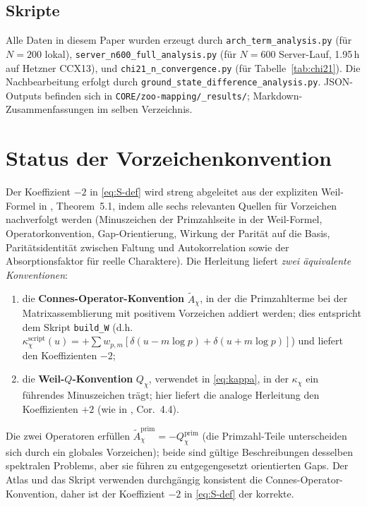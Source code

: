 \documentclass[10pt,twocolumn]{article}
\theoremstyle{definition}
\theoremstyle{remark}
\newcommand{\chifn}{\chi}
\begin{document}
\subsection{Skripte}
Alle Daten in diesem Paper wurden erzeugt durch
\texttt{arch\_term\_analysis.py} (für $N=200$ lokal),
\texttt{server\_n600\_full\_analysis.py} (für $N=600$ Server-Lauf,
1.95\,h auf Hetzner CCX13), und
\texttt{chi21\_n\_convergence.py} (für Tabelle~\ref{tab:chi21}).
Die Nachbearbeitung erfolgt durch \texttt{ground\_state\_difference\_analysis.py}.
JSON-Outputs befinden sich in \texttt{CORE/zoo-mapping/\_results/}; Markdown-Zusammenfassungen im selben Verzeichnis.

\section{Status der Vorzeichenkonvention}
\label{app:sign}

Der Koeffizient $-2$ in \eqref{eq:S-def} wird streng abgeleitet aus
der expliziten Weil-Formel in \cite{AnalyticKernelV2},
Theorem~5.1, indem alle sechs relevanten Quellen für Vorzeichen nachverfolgt werden (Minuszeichen der Primzahlseite in der Weil-Formel,
Operatorkonvention, Gap-Orientierung, Wirkung der Parität auf die Basis, Paritätsidentität zwischen
Faltung und Autokorrelation sowie der Absorptionsfaktor für reelle Charaktere).
Die Herleitung liefert \emph{zwei äquivalente Konventionen}:
\begin{enumerate}
  \item die \textbf{Connes-Operator-Konvention} $\tilde A_{\chifn}$,
    in der die Primzahlterme bei der Matrixassemblierung mit positivem Vorzeichen
    addiert werden; dies entspricht dem Skript
    \texttt{build\_W} (d.h.\ $\kappa^{\mathrm{script}}_{\chifn}(u)
    =+\sum w_{p,m}[\delta(u-m\log p)+\delta(u+m\log p)]$) und
    liefert den Koeffizienten $-2$;
  \item die \textbf{Weil-$Q$-Konvention} $Q_{\chifn}$, verwendet in
    \eqref{eq:kappa}, in der $\kappa_{\chifn}$ ein führendes
    Minuszeichen trägt; hier liefert die analoge Herleitung den
    Koeffizienten $+2$ (wie in \cite{AnalyticKernel}, Cor.~4.4).
\end{enumerate}
Die zwei Operatoren erfüllen
$\tilde A_{\chifn}^{\mathrm{prim}}=-Q_{\chifn}^{\mathrm{prim}}$ (die
Primzahl-Teile unterscheiden sich durch ein globales Vorzeichen); beide sind gültige Beschreibungen
desselben spektralen Problems, aber sie führen zu entgegengesetzt orientierten Gaps.
Der Atlas und das Skript verwenden durchgängig konsistent die Connes-Operator-Konvention,
daher ist der Koeffizient $-2$ in
\eqref{eq:S-def} der korrekte.
\end{document}
